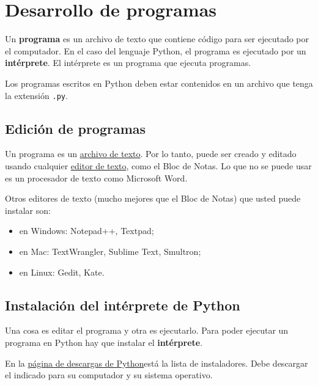 \chapter{Desarrollo de programas}

Un \textbf{programa} es un archivo de texto que contiene código para ser
ejecutado por el computador.
En el caso del lenguaje Python, el programa es ejecutado por un
\textbf{intérprete}. El intérprete es un programa que ejecuta programas.

Los programas escritos en Python deben estar contenidos en un archivo
que tenga la extensión \lstinline!.py!.

\section{Edición de programas}

Un programa es un
\href{http://es.wikipedia.org/wiki/Archivo\_de\_texto}{archivo de
texto}. Por lo tanto, puede ser creado y editado usando cualquier
\href{http://es.wikipedia.org/wiki/Editor\_de\_texto}{editor de texto},
como el Bloc de Notas.
Lo que no se puede usar es un procesador de texto como Microsoft Word.


Otros editores de texto (mucho mejores que el Bloc de Notas) que usted
puede instalar son:

\begin{itemize}
  \item en Windows: Notepad++, Textpad;
  \item en Mac: TextWrangler, Sublime Text, Smultron;
  \item en Linux: Gedit, Kate.
\end{itemize}

\section{Instalación del intérprete de Python}

Una cosa es editar el programa y otra es ejecutarlo. Para poder
ejecutar un programa en Python hay que instalar el \textbf{intérprete}.

En la \href{http://www.python.org/download/}{página de descargas de
Python}\footnotemark está la lista de instaladores. Debe descargar el indicado para
su computador y su sistema operativo.


